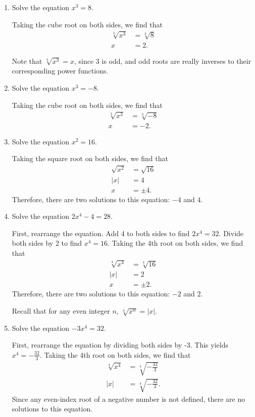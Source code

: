 \documentclass{ximera}
\begin{document}
\begin{example}
\begin{enumerate}
\item Solve the equation $x^3 = 8$. 

Taking the cube root on both sides, we find that 
\begin{align*}
\sqrt[3]{x^3} &= \sqrt[3]{8} \\
x &= 2.
\end{align*}

Note that $\sqrt[3]{x^3} = x$, since 3 is odd, and odd roots are really inverses to their corresponding power functions. 

\item Solve the equation $x^3 = -8$. 

Taking the cube root on both sides, we find that 
\begin{align*}
\sqrt[3]{x^3} &= \sqrt[3]{-8} \\
x &= -2.
\end{align*}

\item Solve the equation $x^2 = 16$. 

Taking the square root on both sides, we find that 
\begin{align*}
\sqrt{x^2} &= \sqrt{16} \\
|x| &= 4\\
x &= \pm 4.
\end{align*}
Therefore, there are two solutions to this equation: $-4$ and $4$.

\item Solve the equation $2x^4 - 4= 28$. 

First, rearrange the equation. Add 4 to both sides to find $2x^4 = 32$. Divide both sides by 2 to find $x^4 = 16$. Taking the 4th root on both sides, we find that 
\begin{align*}
\sqrt[4]{x^4} &= \sqrt[4]{16} \\
|x| &= 2\\
x &= \pm 2.
\end{align*}
Therefore, there are two solutions to this equation: $-2$ and $2$.

Recall that for any even integer $n$, $\sqrt[n]{x^n} = |x|$. 

\item Solve the equation $-3x^4= 32$. 

First, rearrange the equation by dividing both sides by -3. This yields $x^4 = -\frac{32}{3}$. Taking the 4th root on both sides, we find that 
\begin{align*}
\sqrt[4]{x^4} &= \sqrt[4]{-\frac{32}{3}} \\
|x| &= \sqrt[4]{-\frac{32}{3}}.
\end{align*}
Since any even-index root of a negative number is not defined, there are no solutions to this equation.

\end{enumerate}
\end{example}
\end{document}
